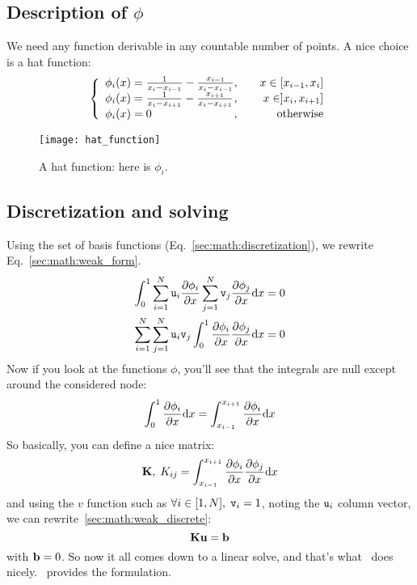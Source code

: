\subsection{Description of \texorpdfstring{$\phi$}{the basis functions}}

We need any function derivable in any countable number of points. A nice
choice is a hat function:
\begin{equation}
\left\{\begin{array}{l@{,\qquad}r}
\phi_i(x) = \frac{1}{x_i - x_{i-1}} - \frac{x_{i-1}}{x_i - x_{i-1}} & x \in [x_{i-1},x_i] \\
\phi_i(x) = \frac{1}{x_i - x_{i+1}} - \frac{x_{i+1}}{x_i - x_{i+1}} & x \in ]x_i,x_{i+1}] \\
\phi_i(x) = 0                                                       & \text{otherwise}
\end{array}\right.
\end{equation}
\begin{figure}
\centering
\texttt{[image: hat\_function]}
\caption{\label{sec:math:hat_function}A hat function: here is $\phi_i$.}
\end{figure}

\subsection{Discretization and solving}

Using the set of basis functions (Eq.~\ref{sec:math:discretization}), we rewrite 
Eq.~\ref{sec:math:weak_form}.
\begin{equation}
\begin{split}
\int_0^1\sum_{i=1}^N\mathtt{u}_i\frac{\partial\phi_i}{\partial x}\sum_{j=1}^N\mathtt{v}_j\frac{\partial\phi_j}{\partial x} \mathrm{d} x & = 0 \\
\sum_{i=1}^N\sum_{j=1}^N\mathtt{u}_i\mathtt{v}_j\int_0^1\frac{\partial\phi_i}{\partial x}\frac{\partial\phi_j}{\partial x} \mathrm{d} x & = 0 \\
\end{split}
\label{sec:math:weak_discrete}
\end{equation}
Now if you look at the functions $\phi$, you'll see that the integrals are null except
around the considered node:
\begin{equation}
\int_0^1\frac{\partial\phi_i}{\partial x} \mathrm{d} x = \int_{x_{i-1}}^{x_{i+1}}\frac{\partial\phi_i}{\partial x} \mathrm{d} x
\end{equation}
So basically, you can define a nice matrix:
\begin{equation}
\mathbf{K},\; K_{ij} = \int_{x_{i-1}}^{x_{i+1}}\frac{\partial\phi_i}{\partial x}\frac{\partial\phi_j}{\partial x} \mathrm{d} x
\end{equation}
and using the $v$ function such as $\forall i \in [1,N], \; \mathtt{v}_i = 1$, noting
 the $\mathtt{u}_i$ column vector, we can
rewrite~\ref{sec:math:weak_discrete}:
\begin{equation}
\mathbf{K} \mathbf{u} = \mathbf{b}
\end{equation}
with $\mathbf{b} = 0$. So now it all comes down to a linear solve, and that's what
\LibMesh\ does nicely. \GRINS\ provides the formulation.

